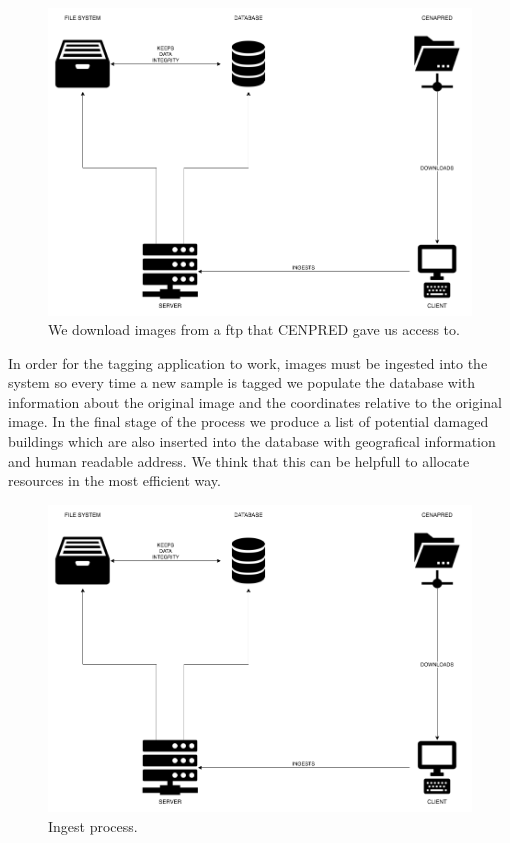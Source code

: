 \begin{figure}[h]
  \centering
  \includegraphics[width=1\textwidth]{images/ingest-diagram.png}
  \caption{We download images from a ftp that CENPRED gave us access to.}
  \label{fig:ingest}
\end{figure}


In order for the tagging application to work, images must be ingested into the system so every time a new sample is tagged we populate the database with information about the original image and the coordinates relative to the original image. In the final stage of the process we produce a list of potential damaged buildings which are also inserted into the database with geografical information and human readable address. We think that this can be helpfull to allocate resources in the most efficient way.\\


\begin{figure}[h]
  \centering
  \includegraphics[width=1\textwidth]{images/ingest-diagram.png}
  \caption{Ingest process.}
  \label{fig:ingest}
\end{figure}


